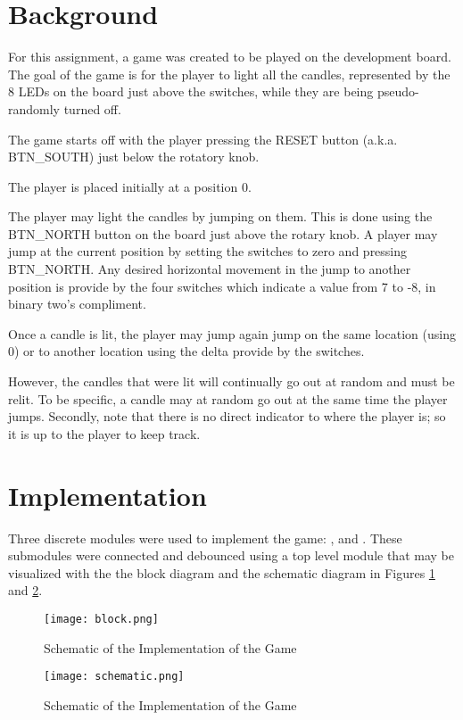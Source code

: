 \documentclass[paper=usletter, fontsize=12pt]{article}
\begin{document}
    \vspace{-0.1in}

    \section{Background}
    For this assignment, a game was created to be played on the development board. The goal of the game is for the player to light all the candles, represented by the 8 LEDs on the board just above the switches, while they are being pseudo-randomly turned off.
    
    The game starts off with the player pressing the RESET button (a.k.a. BTN\_SOUTH) just below the rotatory knob.

    The player is placed initially at a position 0.

    The player may light the candles by jumping on them. This is done using the BTN\_NORTH button on the board just above the rotary knob. A player may jump at the current position by setting the switches to zero and pressing BTN\_NORTH. Any desired horizontal movement in the jump to another position is provide by the four switches which indicate a value from 7 to -8, in binary two's compliment.

    Once a candle is lit, the player may jump again jump on the same location (using 0) or to another location using the delta provide by the switches.

    However, the candles that were lit will continually go out at random and must be relit. To be specific, a candle may at random go out at the same time the player jumps. Secondly, note that there is no direct indicator to where the player is; so it is up to the player to keep track.

    \section{Implementation}
    Three discrete modules were used to implement the game: ,  and . These submodules were connected and debounced using a top level module that may be visualized with the the block diagram and the schematic diagram in Figures \ref{fig:block} and \ref{fig:schematic}.

    \begin{figure}[ht]
        \begin{center}
            \texttt{[image: block.png]}
            \caption{Schematic of the Implementation of the Game} \label{fig:block}
        \end{center}
    \end{figure}

    \begin{figure}[ht]
        \begin{center}
            \texttt{[image: schematic.png]}
            \caption{Schematic of the Implementation of the Game} \label{fig:schematic}
        \end{center}
    \end{figure}
\end{document}
